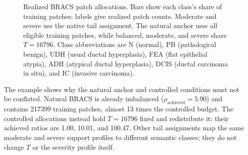 \documentclass[11pt]{article}
\begin{document}
\begin{figure}[ht]
  \centering
  \begingroup
  \newcommand{\allocationpanel}[7]{%
    \begin{scope}[shift={(#1,#2)}]
      \node[font=\small\bfseries, align=center] at (2.55,0.67) {#3};
      \node[font=\scriptsize, align=center] at (2.55,0.34) {$T=\num{#4}$, $\rho_{\mathrm{achieved}}=\num{#5}$};
      \foreach \tick in {0,20,40,60} {
        \draw[gray!25, thin] ({0.085*\tick},0.05) -- ({0.085*\tick},-3.18);
        \node[font=\scriptsize, anchor=north] at ({0.085*\tick},-3.22) {\tick\%};
      }
      \foreach \class/\share/\patches [count=\row from 0] in {#7} {
        \pgfmathsetmacro{\y}{-0.47*\row}
        \node[font=\scriptsize, anchor=east] at (-0.10,\y) {\class};
        \fill[#6] (0,\y-0.14) rectangle ({0.085*\share},\y+0.14);
        \node[font=\scriptsize, anchor=west] at ({0.085*\share+0.05},\y) {\num{\patches}};
      }
    \end{scope}%
  }
  \endgroup
  \caption{Realized BRACS patch allocations. Bars show each class's share of training patches; labels give realized patch counts. Moderate and severe use the native tail assignment. The natural anchor uses all eligible training patches, while balanced, moderate, and severe share $T=\num{16796}$. Class abbreviations are N (normal), PB (pathological benign), UDH (usual ductal hyperplasia), FEA (flat epithelial atypia), ADH (atypical ductal hyperplasia), DCIS (ductal carcinoma in situ), and IC (invasive carcinoma).}
  \label{fig:bracs-realized-allocations}
\end{figure}

\noindent The example shows why the natural anchor and controlled conditions must not be conflated. Natural BRACS is already imbalanced ($\rho_{\mathrm{achieved}}=\num{5.90}$) and contains \num{217399} training patches, almost 13 times the controlled budget. The controlled allocations instead hold $T=\num{16796}$ fixed and redistribute it: their achieved ratios are \num{1.00}, \num{10.01}, and \num{100.47}. Other tail assignments map the same moderate and severe support profiles to different semantic classes; they do not change $T$ or the severity profile itself.
\end{document}
